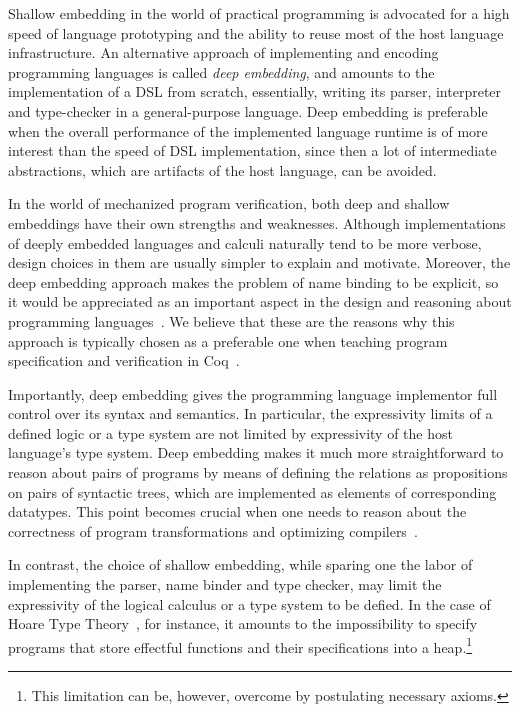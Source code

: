 Shallow embedding in the world of practical programming is advocated
for a high speed of language prototyping and the ability to reuse
most of the host language infrastructure.  An alternative approach of
implementing and encoding programming languages %
is called \textit{deep embedding}, and amounts to the
implementation of a DSL from scratch, essentially,
writing its parser, interpreter and type-checker in a general-purpose
language. Deep embedding is preferable when the overall
performance of the implemented language runtime is of more interest
than the speed of DSL implementation, since then a lot of intermediate
abstractions, which are artifacts of the host language, can be
avoided.

In the world of mechanized program verification, both deep and shallow
embeddings have their own strengths and weaknesses.  Although
implementations of deeply embedded languages and calculi naturally
tend to be more verbose, design choices in them are usually simpler to
explain and motivate. Moreover, the deep embedding approach makes the
problem of name binding to be explicit, so it would be appreciated as
an important aspect in the design and reasoning about programming
languages~\citep{Aydemir2008,Weirich-al:ICFP11,Chargueraud2011}. We
believe that these are the reasons why this approach is typically
chosen as a preferable one when teaching program specification and
verification in Coq~\citep{Pierce-al:SF}.

Importantly, deep embedding gives the programming language implementor
full control over its syntax and semantics.
%
In particular, the expressivity limits of a defined logic or a type
system are not limited by expressivity of the host language's
type system. Deep embedding makes it much more
straightforward to reason about pairs of programs by means of defining
the relations as propositions on pairs of syntactic trees, which are
implemented as elements of corresponding datatypes.  This point
becomes crucial when one needs to reason about the correctness of
program transformations and optimizing compilers~\citep{Appel:BOOK14}.

In contrast, the choice of shallow embedding, while sparing one the
labor of implementing the parser, name binder and type checker, may
limit the expressivity of the logical calculus or a type system to be
defied. In the case of Hoare Type Theory~\citep{Nanevski-al:POPL10},
for instance, it amounts to the impossibility to specify programs that
store effectful functions and their specifications into a
heap.\footnote{This limitation can be, however, overcome by
  postulating necessary axioms.}

